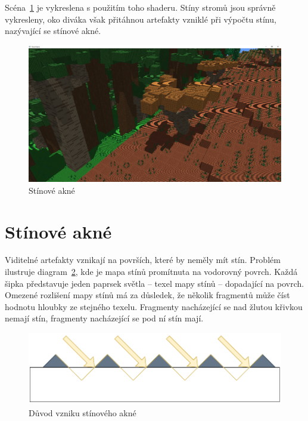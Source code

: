 \documentclass[thesis=M,czech]{FITthesis}[2019/12/23]
\begin{document}
Scéna~\ref{fig:shadows_acne} je vykreslena s použitím toho shaderu. Stíny stromů jsou správně vykresleny, oko diváka však přitáhnou artefakty vzniklé při výpočtu stínu, nazývající se stínové akné.

\begin{figure}\centering
	\includegraphics[width=\textwidth]{images/shadows/acne}
	\caption[Stínové akné]{Stínové akné}\label{fig:shadows_acne}
\end{figure}

\section{Stínové akné}

Viditelné artefakty vznikají na površích, které by neměly mít stín. Problém ilustruje diagram~\ref{fig:shadows_diag_acne}, kde je mapa stínů promítnuta na vodorovný povrch. Každá šipka představuje jeden paprsek světla -- texel mapy stínů -- dopadající na povrch. Omezené rozlišení mapy stínů má za důsledek, že několik fragmentů může číst hodnotu hloubky ze stejného texelu. Fragmenty nacházející se nad žlutou křivkou nemají stín, fragmenty nacházející se pod ní stín mají. 

\begin{figure}\centering
	\includegraphics[width=\textwidth]{images/shadows/diag_acne}
	\caption[Důvod vzniku stínového akné]{Důvod vzniku stínového akné}\label{fig:shadows_diag_acne}
\end{figure}
\end{document}
